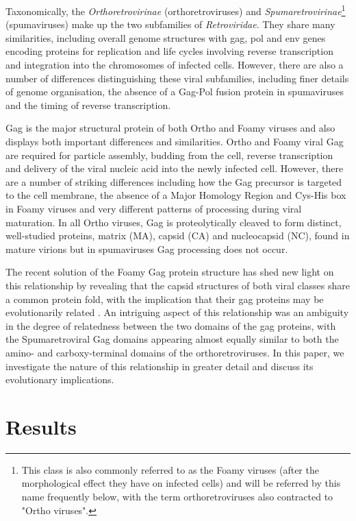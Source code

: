 \documentclass[preprint,12pt]{elsarticle}
\begin{document}
Taxonomically, the {\em Orthoretrovirinae} (orthoretroviruses) and {\em Spumaretrovirinae}\footnote{
This class is also commonly referred to as the Foamy viruses (after the morphological effect they have on infected cells)
and will be referred by this name frequently below, with the term orthoretroviruses also contracted to "Ortho viruses".
}
(spumaviruses) make up the two subfamilies of {\em Retroviridae}. They share many similarities, including overall genome
structures with gag, pol and env genes encoding proteins for replication and life cycles involving reverse transcription
and integration into the chromosomes of infected cells. However, there are also a number of differences distinguishing these
viral subfamilies, including finer details of genome organisation, the absence of a Gag-Pol fusion protein in spumaviruses
and the timing of reverse transcription.

Gag is the major structural protein of both Ortho and Foamy viruses and also displays both important differences and similarities.
Ortho and Foamy viral Gag are required for particle assembly, budding from the cell, reverse transcription and delivery of the
viral nucleic acid into the newly infected cell. However, there are a number of striking differences including how the Gag
precursor is targeted to the cell membrane, the absence of a Major Homology Region and Cys-His box in Foamy viruses and very 
different patterns of processing during viral maturation. In all Ortho viruses, Gag is proteolytically cleaved to form distinct,
well-studied proteins, matrix (MA), capsid (CA) and nucleocapsid (NC), found in mature virions but in spumaviruses Gag processing
does not occur.

The recent solution of the Foamy Gag protein structure has shed new light on this relationship by revealing that
the capsid structures of both viral classes share a common protein fold, with the implication that their gag proteins may
be evolutionarily related \cite{BallNJet16}.   An intriguing aspect of this relationship was an ambiguity in the degree of
relatedness between the two domains of the gag proteins, with the Spumaretroviral Gag domains appearing almost equally
similar to both the amino- and carboxy-terminal domains of the orthoretroviruses.   In this paper, we investigate the
nature of this relationship in greater detail and discuss its evolutionary implications.

\section{Results}
\end{document}
